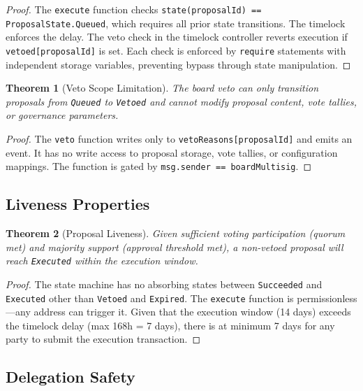 \documentclass[11pt,letterpaper]{article}
\newtheorem{theorem}{Theorem}[section]
\begin{document}
\begin{proof}
The \texttt{execute} function checks \texttt{state(proposalId) == ProposalState.Queued}, which requires all prior state transitions. The timelock enforces the delay. The veto check in the timelock controller reverts execution if \texttt{vetoed[proposalId]} is set. Each check is enforced by \texttt{require} statements with independent storage variables, preventing bypass through state manipulation.
\end{proof}

\begin{theorem}[Veto Scope Limitation]
The board veto can only transition proposals from \texttt{Queued} to \texttt{Vetoed} and cannot modify proposal content, vote tallies, or governance parameters.
\end{theorem}

\begin{proof}
The \texttt{veto} function writes only to \texttt{vetoReasons[proposalId]} and emits an event. It has no write access to proposal storage, vote tallies, or configuration mappings. The function is gated by \texttt{msg.sender == boardMultisig}.
\end{proof}

\subsection{Liveness Properties}

\begin{theorem}[Proposal Liveness]
Given sufficient voting participation (quorum met) and majority support (approval threshold met), a non-vetoed proposal will reach \texttt{Executed} within the execution window.
\end{theorem}

\begin{proof}
The state machine has no absorbing states between \texttt{Succeeded} and \texttt{Executed} other than \texttt{Vetoed} and \texttt{Expired}. The \texttt{execute} function is permissionless---any address can trigger it. Given that the execution window (14 days) exceeds the timelock delay (max 168h = 7 days), there is at minimum 7 days for any party to submit the execution transaction.
\end{proof}

\subsection{Delegation Safety}
\end{document}
